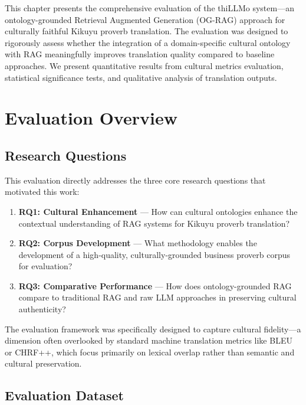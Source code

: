 \label{ch:evaluation}

This chapter presents the comprehensive evaluation of the thiLLMo system---an ontology-grounded Retrieval Augmented Generation (OG-RAG) approach for culturally faithful Kikuyu proverb translation. The evaluation was designed to rigorously assess whether the integration of a domain-specific cultural ontology with RAG meaningfully improves translation quality compared to baseline approaches. We present quantitative results from cultural metrics evaluation, statistical significance tests, and qualitative analysis of translation outputs.

\section{Evaluation Overview}
\label{sec:evaluation_overview}

\subsection{Research Questions}

This evaluation directly addresses the three core research questions that motivated this work:

\begin{enumerate}
    \item \textbf{RQ1: Cultural Enhancement} --- How can cultural ontologies enhance the contextual understanding of RAG systems for Kikuyu proverb translation?
    \item \textbf{RQ2: Corpus Development} --- What methodology enables the development of a high-quality, culturally-grounded business proverb corpus for evaluation?
    \item \textbf{RQ3: Comparative Performance} --- How does ontology-grounded RAG compare to traditional RAG and raw LLM approaches in preserving cultural authenticity?
\end{enumerate}

The evaluation framework was specifically designed to capture cultural fidelity---a dimension often overlooked by standard machine translation metrics like BLEU or CHRF++, which focus primarily on lexical overlap rather than semantic and cultural preservation.

\subsection{Evaluation Dataset}

